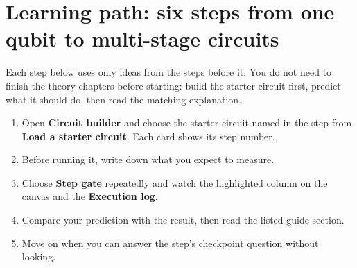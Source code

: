 \section{Learning path: six steps from one qubit to multi-stage circuits}
\hypertarget{learning-path}{}

Each step below uses only ideas from the steps before it. You do not need to
finish the theory chapters before starting: build the starter circuit first,
predict what it should do, then read the matching explanation.

\begin{center}
\end{center}

\begin{beginnerbox}
\begin{enumerate}
  \item Open \textbf{Circuit builder} and choose the starter circuit named in
  the step from \textbf{Load a starter circuit}. Each card shows its step
  number.
  \item Before running it, write down what you expect to measure.
  \item Choose \textbf{Step gate} repeatedly and watch the highlighted column
  on the canvas and the \textbf{Execution log}.
  \item Compare your prediction with the result, then read the listed guide
  section.
  \item Move on when you can answer the step's checkpoint question without
  looking.
\end{enumerate}
\end{beginnerbox}

